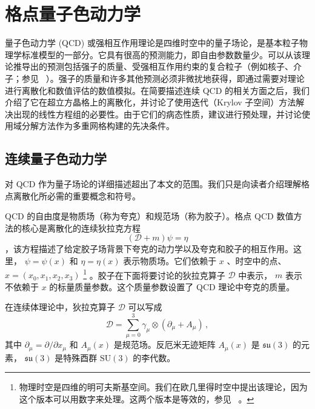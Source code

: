 \documentclass{siamltex}
\newcommand{\Dslash}{\mathcal{D}}
\begin{document}
\section{格点量子色动力学  }       \label{qcd_section}    量子色动力学 (QCD) 或强相互作用理论是四维时空中的量子场论，是基本粒子物理学标准模型的一部分。它具有很高的预测能力，即自由参数数量少。可以从该理论推导出的预测包括强子的质量、受强相互作用约束的复合粒子（例如核子、介子；参见~    \cite{Durr21112008}   ）。强子的质量和许多其他预测必须非微扰地获得，即通过需要对理论进行离散化和数值评估的数值模拟。在简要描述连续 QCD 的相关方面之后，我们介绍了它在超立方晶格上的离散化，并讨论了使用迭代（Krylov 子空间）方法解决出现的线性方程组的必要性。由于它们的病态性质，建议进行预处理，并讨论使用域分解方法作为多重网格构建的先决条件。
\subsection{连续量子色动力学  }       \label{continuum_qcd}    对 QCD 作为量子场论的详细描述超出了本文的范围。我们只是向读者介绍理解格点离散化所必需的重要概念和符号。

QCD 的自由度是物质场（称为夸克）和规范场（称为胶子）。格点 QCD 数值方法的核心是离散化的连续狄拉克方程    \begin{equation}\label{Dirac_eq}
  (\Dslash+m)\psi = \eta
\end{equation}   ，该方程描述了给定胶子场背景下夸克的动力学以及夸克和胶子的相互作用。这里，   $\psi = \psi(x)$    和    $\eta = \eta(x)$    表示物质场。它们依赖于    $x$    、时空中的点、   $x=(x_0,x_1,x_2,x_3)$       \footnote{物理时空是四维的明可夫斯基空间。我们在欧几里得时空中提出该理论，因为这个版本可以用数字来处理。这两个版本是等效的，参见~    \cite{montvay1994quantum}    。  }    。胶子在下面将要讨论的狄拉克算子    $\Dslash$    中表示，   $m$    表示不依赖于    $x$    的标量质量参数。这个质量参数设置了 QCD 理论中夸克的质量。

在连续体理论中，狄拉克算子    $\Dslash$    可以写成
\[
  \Dslash=\sum_{\mu=0}^3\gamma_\mu \otimes \left( \partial_\mu + A_\mu \right)\,,
\]    其中    $ \partial_\mu = \partial / \partial x_\mu$    和    $A_\mu(x)$    是规范场。反厄米无迹矩阵    $A_\mu(x)$    是    $\mathfrak{su}(3)$    的元素，   $\mathfrak{su}(3)$    是特殊酉群    $\mathrm{SU}(3)$    的李代数。
\end{document}
